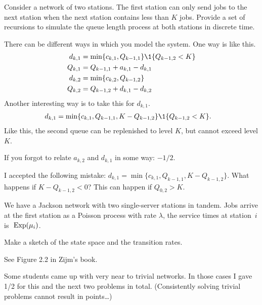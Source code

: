 \begin{exercise}[201804]
Consider a network of two stations. The first station can only send jobs to the next station when the next station contains less than $K$ jobs. Provide a set of recursions to simulate the queue length process at both stations in discrete time. 

\begin{solution}
 There can be different ways in which you model the system. One way is like this.
 \begin{align*}
 d_{k,1} &= \min\{c_{k,1}, Q_{k-1, 1}\}\1{Q_{k-1,2}<K} \\
 Q_{k,1} &= Q_{k-1,1} + a_{k,1} - d_{k,1}\\
 d_{k,2} &= \min\{c_{k,2}, Q_{k-1, 2}\} \\
 Q_{k,2} &= Q_{k-1,2} + d_{k,1} - d_{k,2}\\
 \end{align*}
Another interesting way is to take this for $d_{k,1}$.
 \begin{align*}
 d_{k,1} &= \min\{c_{k,1}, Q_{k-1, 1}, K-Q_{k-1,2}\}\1{Q_{k-1,2}<K}.
 \end{align*}
Like this, the second queue can be replenished to level $K$, but cannot exceed level $K$. 

If you forgot to relate $a_{k,2}$ and $d_{k,1}$ in some way: $-1/2$. 

I accepted the following mistake: 
$d_{k,1} = \min\{c_{k,1}, Q_{k-1, 1}, K-Q_{k-1,2}\}$. What happens if $K-Q_{k-1,2}<0$? This can happen if $Q_{0,2} > K$.

\end{solution}
\end{exercise}

We have a Jackson network with two single-server stations in tandem. Jobs
arrive at the first station as a Poisson process with rate $\lambda$,
the service times at station~$i$ is $~\operatorname{Exp}(\mu_i)$.


\begin{exercise}[201804]
Make a sketch of the state space and the transition rates.
\begin{solution}
 See Figure 2.2 in Zijm's book.

Some students came up with very near to trivial networks. In those cases I gave 1/2 for this and the next two problems in total. (Consistently solving trivial problems cannot result in points\ldots)
\end{solution}
\end{exercise}

